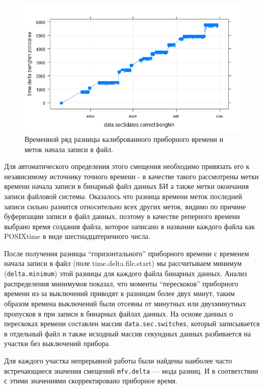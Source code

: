 \begin{figure}
	\centering
	\includegraphics[width=0.9\linewidth]{images/deprontimeplot}
	\caption[Временной ряд разницы калиброванного приборного времени и меток начала записи в файл.]{Временной ряд разницы калиброванного приборного времени и меток начала записи в файл.}
	\label{fig:deprontimeplot}
\end{figure}


Для автоматического определения этого смещения необходимо привязать его к независимому источнику точного времени - в качестве такого рассмотрены метки времени начала записи в бинарный файл данных БИ а также метки окончания записи файловой системы. Оказалось что разница времени меток последней записи сильно разнится относительно всех других меток, видимо по причине буферизации записи в файл данных, поэтому в качестве реперного времени выбрано время создания файла, которое записано в названии каждого файла как POSIXtime в виде шестнадцатеричного числа.

После получения разницы ``горизонтального'' приборного времени с временем начала записи в файл (поле time.delta.file.start) мы рассчитываем минимум (\texttt{delta.minimum}) этой разницы для каждого файла бинарных данных. Анализ распределения минимумов показал, что моменты ``перескоков'' приборного времени из-за выключений приводят к разницам более двух минут, таким образом времена выключений были отсеяны от минутных или двухминутных пропусков в при записи в бинарных файлах данных. На основе данных о перескоках времени составлен массив \texttt{data.sec.switches}, который записывается в отдельный файл и также исходный массив секундных данных разбивается на участки без выключений прибора.

Для каждого участка непрерывной работы были найдены наиболее часто встречающиеся значения смещений \texttt{mfv.delta} --- мода разниц. И в соответствии с этими значениями скорректировано приборное время.

